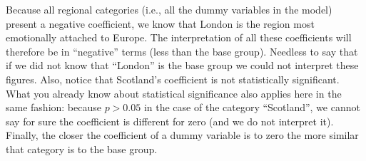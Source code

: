 Because all regional categories (i.e., all the dummy variables in the model) present a negative coefficient, we know that London is the region most emotionally attached to Europe. The interpretation of all these coefficients will therefore be in ``negative'' terms (less than the base group). Needless to say that if we did not know that ``London'' is the base group we could not interpret these figures. Also, notice that Scotland's coefficient is not statistically significant. What you already know about statistical significance also applies here in the same fashion: because $p > 0.05$ in the case of the category ``Scotland'', we cannot say for sure the coefficient is different for zero (and we do not interpret it). Finally, the closer the coefficient of a dummy variable is to zero the more similar that category is to the base group.   